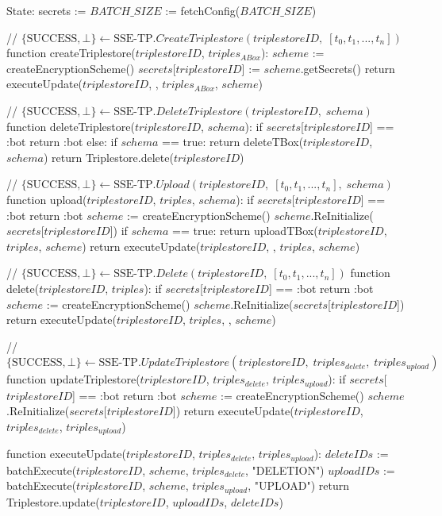 State:
    secrets := {}
    $BATCH\_SIZE$ := fetchConfig($BATCH\_SIZE$)

// $\{\textrm{SUCCESS}, \bot\} \leftarrow \textrm{SSE-TP}.CreateTriplestore(triplestoreID, \; [t_0, t_1, ..., t_n])$
function createTriplestore($triplestoreID$, $triples_{ABox}$):
    $scheme$ := createEncryptionScheme() 
    $secrets$[$triplestoreID$] := $scheme$.getSecrets()
    return executeUpdate($triplestoreID$, {}, $triples_{ABox}$, $scheme$)

// $\{\textrm{SUCCESS}, \bot\} \leftarrow \textrm{SSE-TP}.DeleteTriplestore(triplestoreID, \; schema)$
function deleteTriplestore($triplestoreID$, $schema$):
    if $secrets$[$triplestoreID$] == :bot
        return :bot
    else:
        if $schema$ == true:
            return deleteTBox($triplestoreID$, $schema$)
        return Triplestore.delete($triplestoreID$)

// $\{\textrm{SUCCESS}, \bot\} \leftarrow \textrm{SSE-TP}.Upload(triplestoreID, \; [t_0, t_1, ..., t_n], \; schema)$
function upload($triplestoreID$, $triples$, $schema$):
    if $secrets$[$triplestoreID$] == :bot
        return :bot
    $scheme$ := createEncryptionScheme()
    $scheme$.ReInitialize($secrets$[$triplestoreID$])
    if $schema$ == true:
        return uploadTBox($triplestoreID$, $triples$, $scheme$)
    return executeUpdate($triplestoreID$, {}, $triples$, $scheme$)

// $\{\textrm{SUCCESS}, \bot\} \leftarrow \textrm{SSE-TP}.Delete(triplestoreID, \; [t_0, t_1, ..., t_n])$
function delete($triplestoreID$, $triples$):
    if $secrets$[$triplestoreID$] == :bot
        return :bot
    $scheme$ := createEncryptionScheme()
    $scheme$.ReInitialize($secrets$[$triplestoreID$])
    return executeUpdate($triplestoreID$, $triples$, {}, $scheme$)

// $\{\textrm{SUCCESS}, \bot\} \leftarrow \textrm{SSE-TP}.UpdateTriplestore(triplestoreID, \; triples_{delete}, \; triples_{upload})$
function updateTriplestore($triplestoreID$, $triples_{delete}$, $triples_{upload}$):
    if $secrets$[$triplestoreID$] == :bot
        return :bot
    $scheme$ := createEncryptionScheme()
    $scheme$.ReInitialize($secrets$[$triplestoreID$])
    return executeUpdate($triplestoreID$, $triples_{delete}$, $triples_{upload}$)

function executeUpdate($triplestoreID$, $triples_{delete}$, $triples_{upload}$):
    $deleteIDs$ := batchExecute($triplestoreID$, $scheme$, $triples_{delete}$, "DELETION")
    $uploadIDs$ := batchExecute($triplestoreID$, $scheme$, $triples_{upload}$, "UPLOAD")
    return Triplestore.update($triplestoreID$, $uploadIDs$, $deleteIDs$)

